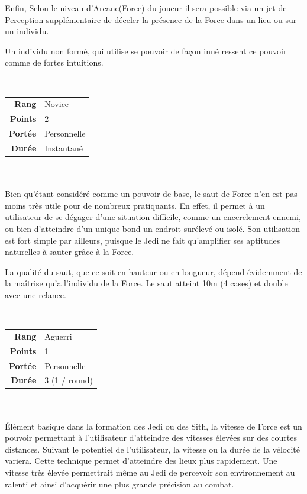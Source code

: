 \begin{description}[align=left]
        Enfin, Selon le niveau d’Arcane(Force) du joueur il sera possible via un jet de Perception supplémentaire de déceler la présence de la Force dans un lieu ou sur un individu.

        Un individu non formé, qui utilise se pouvoir de façon inné ressent ce pouvoir comme de fortes intuitions.
        \\  

    \item [Saut de Force] ~ \\

        \begin{tabular}{ r l }
            \textbf{Rang}    & Novice \\
            \textbf{Points}  & 2 \\
            \textbf{Portée}  & Personnelle \\
            \textbf{Durée}   & Instantané \\
        \end{tabular}
        \\ \\
        Bien qu’étant considéré comme un pouvoir de base, le saut de Force n’en est pas moins très utile pour de nombreux pratiquants. En effet, il permet à un utilisateur de se dégager d’une situation difficile, comme un encerclement ennemi, ou bien d’atteindre d’un unique bond un endroit surélevé ou isolé. Son utilisation est fort simple par ailleurs, puisque le Jedi ne fait qu’amplifier ses aptitudes naturelles à sauter grâce à la Force. 

        La qualité du saut, que ce soit en hauteur ou en longueur, dépend évidemment de la maîtrise qu’a l’individu de la Force. Le saut atteint 10m (4 cases) et double avec une relance.
        \\

    \item [Vitesse de Force] ~ \\

        \begin{tabular}{ r l }
            \textbf{Rang}    & Aguerri \\
            \textbf{Points}  & 1 \\
            \textbf{Portée}  & Personnelle \\
            \textbf{Durée}   & 3 (1 / round) \\
        \end{tabular}
        \\ \\
        \'Elément basique dans la formation des Jedi ou des Sith, la vitesse de Force est un pouvoir permettant à l’utilisateur d’atteindre des vitesses élevées sur des courtes distances. Suivant le potentiel de l’utilisateur, la vitesse ou la durée de la vélocité variera. Cette technique permet d’atteindre des lieux plus rapidement. Une vitesse très élevée permettrait même au Jedi de percevoir son environnement au ralenti et ainsi d’acquérir une plus grande précision au combat.


\end{description}
